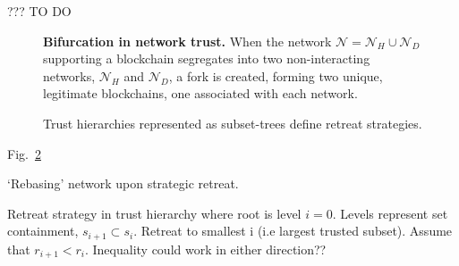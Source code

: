 

??? TO DO

\begin{figure}[!htb]
	\centering
	\resizebox{0.5\columnwidth}{!}{
	
	}
	\caption{\textbf{Bifurcation in network trust.} When the network \mbox{$\mathcal{N}=\mathcal{N}_H\cup\mathcal{N}_D$} supporting a blockchain segregates into two non-interacting networks, $\mathcal{N}_H$ and $\mathcal{N}_D$, a fork is created, forming two unique, legitimate blockchains, one associated with each network.} \label{fig:forking}
\end{figure}

\begin{figure}[!htb]
	\caption{Trust hierarchies represented as subset-trees define retreat strategies.} \label{fig:subset_tree}
\end{figure}

Fig.~\ref{fig:subset_tree}

`Rebasing' network upon strategic retreat.

Retreat strategy in trust hierarchy where root is level $i=0$. Levels represent set containment, $s_{i+1}\subset s_i$. Retreat to smallest i (i.e largest trusted subset). Assume that $r_{i+1}<r_i$. Inequality could work in either direction??
